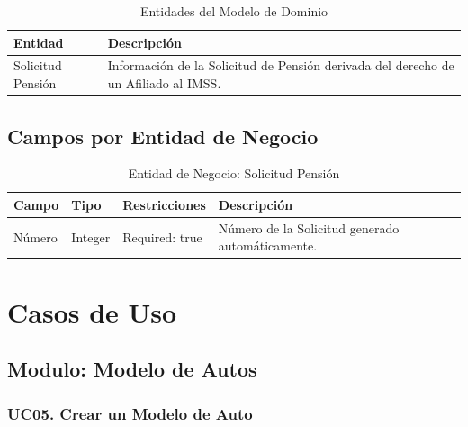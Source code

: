 \documentclass[10pt, letterpaper]{report}
\begin{document}
\begin{table}[h]
	\caption{Entidades del Modelo de Dominio}
	\label{tab:entities}
	\begin{center}
	\begin{tabular}{ l l } 
		\hline
		\textbf{Entidad} & \textbf{Descripción} \\
		\hline
		Solicitud Pensión & Información de la Solicitud de Pensión derivada del derecho de un Afiliado al IMSS. \\ 
		\hline
	\end{tabular}
	\end{center}
\end{table}

\section{Campos por Entidad de Negocio} \label{sec:entity-fields}

\begin{table}[h]
	\caption{Entidad de Negocio: Solicitud Pensión}
	\label{tab:fields-solicitudpension}
	\begin{center}
	\begin{tabular}{ l l l l } 
		\hline
		\textbf{Campo} & \textbf{Tipo} & \textbf{Restricciones} & \textbf{Descripción} \\
		\hline
		Número & Integer & Required: true & Número de la Solicitud generado automáticamente. \\ 
		\hline
	\end{tabular}
	\end{center}
\end{table}

\chapter{Casos de Uso}


\section{Modulo: Modelo de Autos} \label{sec:cumodeloautoservices}

\subsection{UC05. Crear un Modelo de Auto} \label{sec:cucrearmodeloauto}
\end{document}
